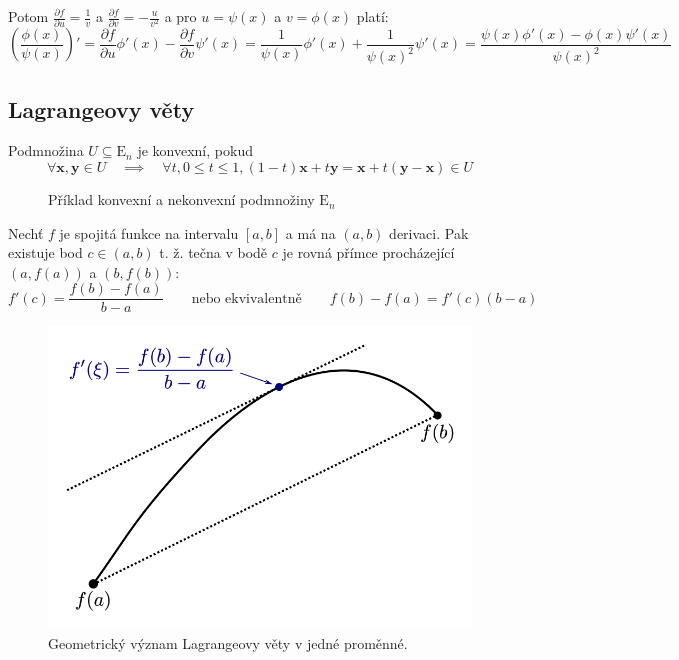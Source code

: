 \documentclass[../main.tex]{subfiles}
\begin{document}
Potom $ \frac{\partial f}{\partial u} = \frac{1}{v} $ a $ \frac{\partial f}{\partial v} = -\frac{u}{v^2} $
a pro $u = \psi (x)$ a $ v = \phi (x) $ platí:
\[ \left( \frac{\phi (x)}{\psi (x)} \right)' =
\frac{\partial f}{\partial u} \phi '(x) - \frac{\partial f}{\partial v} \psi '(x) =
\frac{1}{\psi (x)} \phi '(x) + \frac{1}{\psi (x)^2}\psi '(x) =
\frac{\psi (x)\phi '(x) - \phi (x)\psi '(x)}{\psi (x)^2} \]

\subsection{Lagrangeovy věty}
\begin{definition}
	Podmnožina $U \subseteq \mathrm{E}_n$ je konvexní, pokud
	$$\forall \mathbf{x}, \mathbf{y} \in U \quad \implies \quad \forall t, 0 \le t \le 1, (1 - t) \mathbf{x} + t \mathbf{y} = \mathbf{x} + t( \mathbf{y} - \mathbf{x}) \in U$$
\end{definition}

\begin{figure}[h]
	\centering
	\hspace{5em}
	\caption{Příklad konvexní a nekonvexní podmnožiny $\mathrm{E}_n$}%
\end{figure}

\begin{theorem}
	Nechť $f$ je spojitá funkce na intervalu $[a, b]$ a má na $(a, b)$ derivaci. Pak existuje bod $c \in (a, b)$ t. ž. tečna v bodě $c$ je rovná přímce procházející $(a, f(a))$ a $(b, f(b))$: $$f'(c) = \frac{f(b) - f(a)}{b - a} \qquad \text{nebo ekvivalentně} \qquad f(b) - f(a) = f'(c)(b - a)$$
\end{theorem}

\begin{figure}[h]
	\centering
	\includegraphics[width=0.5\linewidth]{02-lagrange}%
	\caption{Geometrický význam Lagrangeovy věty v jedné proměnné.}%
	\label{fig:par}
\end{figure}
\end{document}
